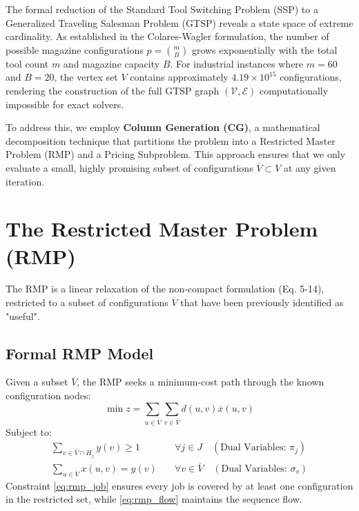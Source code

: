 \documentclass[12pt]{article}
\begin{document}
The formal reduction of the Standard Tool Switching Problem (SSP) to a Generalized Traveling Salesman Problem (GTSP) reveals a state space of extreme cardinality. As established in the Colares-Wagler formulation, the number of possible magazine configurations $p = \binom{m}{B}$ grows exponentially with the total tool count $m$ and magazine capacity $B$. For industrial instances where $m=60$ and $B=20$, the vertex set $V$ contains approximately $4.19 \times 10^{15}$ configurations, rendering the construction of the full GTSP graph $(\mathcal{V}, \mathcal{E})$ computationally impossible for exact solvers.

To address this, we employ \textbf{Column Generation (CG)}, a mathematical decomposition technique that partitions the problem into a Restricted Master Problem (RMP) and a Pricing Subproblem. This approach ensures that we only evaluate a small, highly promising subset of configurations $\overline{V} \subset V$ at any given iteration.

\section{The Restricted Master Problem (RMP)}

The RMP is a linear relaxation of the non-compact formulation (Eq. 5-14), restricted to a subset of configurations $\overline{V}$ that have been previously identified as "useful".

\subsection{Formal RMP Model}
Given a subset $\overline{V}$, the RMP seeks a minimum-cost path through the known configuration nodes:
\begin{equation}
    \min z = \sum_{u \in \overline{V}} \sum_{v \in \overline{V}} d(u,v) \overline{x}(u,v)
\end{equation}
Subject to:
\begin{align}
    \sum_{v \in \overline{V} \cap H_{j}} y(v) \ge 1 & \quad \forall j \in J \quad (\text{Dual Variables: } \pi_j) \label{eq:rmp_job} \\
    \sum_{u \in \overline{V}} x(u,v) = y(v) & \quad \forall v \in \overline{V} \quad (\text{Dual Variables: } \sigma_v) \label{eq:rmp_flow}
\end{align}
Constraint \eqref{eq:rmp_job} ensures every job is covered by at least one configuration in the restricted set, while \eqref{eq:rmp_flow} maintains the sequence flow.
\end{document}
